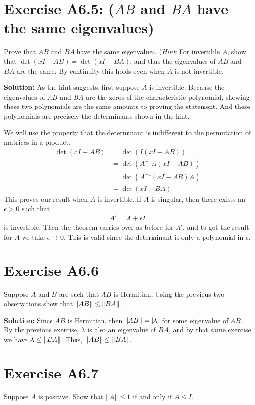 \documentclass{book}
\begin{document}
\section*{Exercise A6.5: ($AB$ and $BA$ have the same eigenvalues)}
    Prove that $AB$ and $BA$ have the same eigenvalues. (\emph{Hint}: For invertible $A$, show that $\det(xI-AB) = \det(xI-BA)$, and thus the eigenvalues of $AB$ and $BA$ are the same. By continuity this holds even when $A$ is not invertible.
    
    \textbf{Solution:} As the hint suggests, first suppose $A$ is invertible. Because the eigenvalues of $AB$ and $BA$ are the zeros of the characteristic polynomial, showing these two polynomials are the same amounts to proving the statement. And these polynomials are precisely the determinants shown in the hint. 
    
    We will use the property that the determinant is indifferent to the permutation of matrices in a product.
    \begin{align}
        \det(xI-AB) &= \det(I(xI-AB)) \\
        &= \det(A^{-1}A(xI-AB)) \\
        &= \det(A^{-1}(xI-AB)A) \\
        &= \det(xI-BA)
    \end{align}
    This proves our result when $A$ is invertible. If $A$ is singular, then there exists an $\epsilon>0$ such that
    \begin{align}
        A' = A + \epsilon I 
    \end{align}
    is invertible. Then the theorem carries over as before for $A'$, and to get the result for $A$ we take $\epsilon\rightarrow 0$. This is valid since the determinant is only a polynomial in $\epsilon$.
    
\section*{Exercise A6.6}
    Suppose $A$ and $B$ are such that $AB$ is Hermitian. Using the previous two observations show that $\norm{AB}\leq\norm{BA}$.
    
    \textbf{Solution:} Since $AB$ is Hermitian, then $\norm{AB} = \abs{\lambda}$ for some eigenvalue of $AB$. By the previous exercise, $\lambda$ is also an eigenvalue of $BA$, and by that same exercise we have $\lambda \leq \norm{BA}$. Thus, $\norm{AB}
    \leq\norm{BA}$.
    
\section*{Exercise A6.7}
    Suppose $A$ is positive. Show that $\norm{A}\leq 1$ if and only if $A \leq I$.
    
\end{document}
